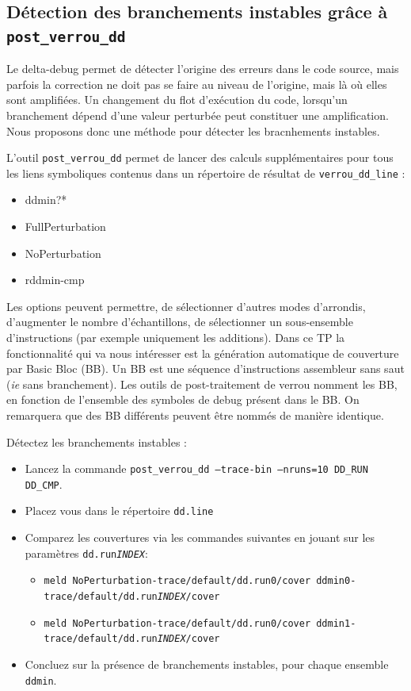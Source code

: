 \documentclass[a4paper]{article}
\newcounter{Question}
\newenvironment{question}[1][\unskip]{
  \bigskip
  \stepcounter{Question}
  \def\questionTitle{ #1}
  \begin{mdframed}[style=question]
  }{
  \end{mdframed}
}
\begin{document}
\subsection{Détection des branchements instables grâce à \texttt{post\_verrou\_dd}}
Le delta-debug permet de détecter l'origine des erreurs dans le code
source, mais parfois la correction ne doit pas se faire au niveau de
l'origine, mais là où elles sont amplifiées.
Un changement du flot d'exécution du code,
lorsqu'un branchement dépend d'une valeur perturbée peut constituer
une amplification. Nous proposons donc une méthode pour détecter les
bracnhements instables.


L'outil \texttt{post\_verrou\_dd} permet de lancer des calculs supplémentaires pour tous les
liens symboliques contenus dans un répertoire de résultat de \texttt{verrou\_dd\_line} :
\begin{itemize}
\item ddmin?*
\item FullPerturbation
\item NoPerturbation
\item rddmin-cmp
\end{itemize}
Les options peuvent permettre, de sélectionner d'autres modes
d'arrondis, d'augmenter le nombre d'échantillons, de sélectionner un
sous-ensemble d'instructions (par exemple uniquement les
additions). Dans ce TP la fonctionnalité qui va nous intéresser 
est la génération automatique de couverture par Basic Bloc (BB). Un BB
est une séquence d'instructions assembleur sans saut (\textit{ie} sans
branchement). Les outils de
post-traitement de verrou nomment les BB, en fonction de l'ensemble des
symboles de debug présent dans le BB. On remarquera que des BB
différents peuvent être nommés de manière identique. 

\begin{question}
  Détectez les branchements instables :
  \begin{itemize}
  \item Lancez la commande \texttt{post\_verrou\_dd --trace-bin --nruns=10 DD\_RUN DD\_CMP}.
  \item Placez vous dans le répertoire \texttt{dd.line}
  \item Comparez les couvertures via les commandes suivantes en jouant
    sur les paramètres \texttt{dd.run\textit{INDEX}}: 
    \begin{itemize}
      \item \texttt{meld NoPerturbation-trace/default/dd.run0/cover ddmin0-trace/default/dd.run\textit{INDEX}/cover}
      \item \texttt{meld NoPerturbation-trace/default/dd.run0/cover ddmin1-trace/default/dd.run\textit{INDEX}/cover}
    \end{itemize}
  \item Concluez sur la présence de branchements instables, pour
    chaque ensemble \texttt{ddmin}.
  \end{itemize}
\end{question}
\end{document}
